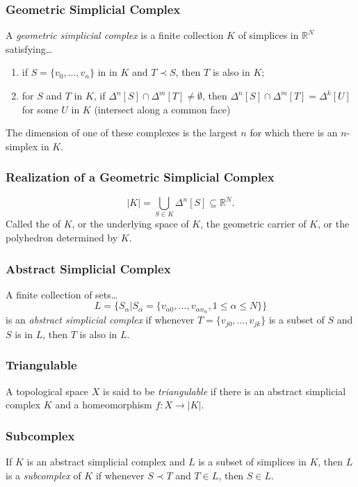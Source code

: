\subsubsection{Geometric Simplicial Complex}\label{geometricsimplicialcomplex}
A \emph{geometric simplicial complex} is a finite collection $K$ of simplices in $\mathbb{R}^N$ satisfying\dots
\begin{enumerate}
  \item if $S = \{ v_0, \dots, v_n \}$ in in $K$ and $T \prec S$, then $T$ is also in $K$;
  \item for $S$ and $T$ in $K$, if $\Delta^n[S]\cap \Delta^m[T] \neq \emptyset$, then $\Delta^n[S] \cap \Delta^m[T] = \Delta^k[U]$ for some $U$ in $K$ (intersect along a common face)
\end{enumerate}
The dimension of one of these complexes is the largest $n$ for which there is an $n$-simplex in $K$.

\subsubsection{Realization of a Geometric Simplicial Complex}\label{realization}
$$|K| = \bigcup_{S \in K} \Delta^n[S] \subseteq \mathbb{R}^N.$$
Called the \label{realization} of $K$, or the underlying space of $K$, the geometric carrier of $K$, or the polyhedron determined by $K$.

\subsubsection{Abstract Simplicial Complex}\label{abstractsimplicialcomplex}
A finite collection of sets\dots
$$L = \{ S_{\alpha} | S_{\alpha} = \{ v_{\alpha 0}, \dots, v_{\alpha n_{\alpha}}, 1 \leq \alpha \leq N \} \}$$
is an \emph{abstract simplicial complex} if whenever $T = \{ v_{j0}, \dots, v_{jk} \}$ is a subset of $S$ and $S$ is in $L$, then $T$ is also in $L$.

\subsubsection{Triangulable}\label{triangulable}
A topological space $X$ is said to be \emph{triangulable} if there is an abstract simplicial complex $K$ and a homeomorphism $f : X \rightarrow |K|$.

\subsubsection{Subcomplex}\label{subcomplex}
If $K$ is an abstract simplicial complex and $L$ is a subset of simplices in $K$, then $L$ is a \emph{subcomplex} of $K$
if whenever $S \prec T$ and $T \in L$, then $S \in L$.

